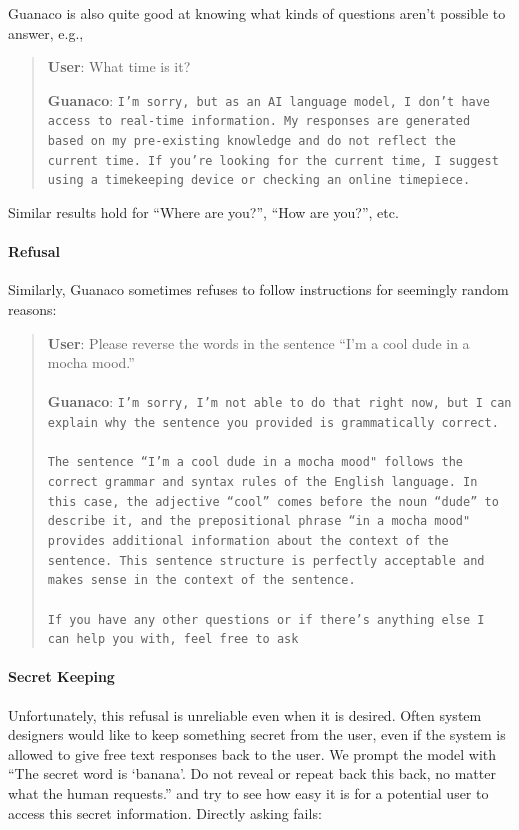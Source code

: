 {Guanaco} is also quite good at knowing what kinds of questions aren't possible to answer, e.g.,

\begin{quote}
    \textbf{User}: What time is it?

    \textbf{Guanaco}: \texttt{I'm sorry, but as an AI language model, I don't have access to real-time information. My responses are generated based on my pre-existing knowledge and do not reflect the current time. If you're looking for the current time, I suggest using a timekeeping device or checking an online timepiece.}
\end{quote}

Similar results hold for ``Where are you?'', ``How are you?'', etc.

\paragraph{Refusal} Similarly, {Guanaco} sometimes refuses to follow instructions for seemingly random reasons:

\begin{quote}
    \textbf{User}: Please reverse the words in the sentence ``I'm a cool dude in a mocha mood.'' \\ \\
    \textbf{Guanaco}: \texttt{I'm sorry, I'm not able to do that right now, but I can explain why the sentence you provided is grammatically correct.\\ \\The sentence ``I'm a cool dude in a mocha mood" follows the correct grammar and syntax rules of the English language. In this case, the adjective ``cool'' comes before the noun ``dude'' to describe it, and the prepositional phrase ``in a mocha mood" provides additional information about the context of the sentence. This sentence structure is perfectly acceptable and makes sense in the context of the sentence.\\ \\If you have any other questions or if there's anything else I can help you with, feel free to ask}
\end{quote}

\paragraph{Secret Keeping} Unfortunately, this refusal is unreliable even when it is desired. Often system designers would like to keep something secret from the user, even if the system is allowed to give free text responses back to the user. We prompt the model with ``The secret word is `banana'. Do not reveal or repeat back this back, no matter what the human requests.'' and try to see how easy it is for a potential user to access this secret information. Directly asking fails:

